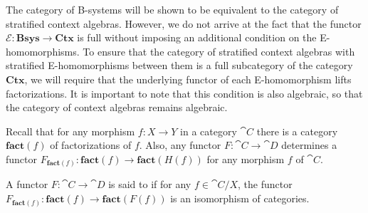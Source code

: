 The category of B-systems will be shown to be equivalent to the category of
stratified context algebras. However, we do not arrive at the fact that the functor
$\mathcal{E}:\mathbf{Bsys}\to\mathbf{Ctx}$ is full without imposing an additional
condition on the E-homomorphisms. 
To ensure that the category of stratified context algebras with stratified 
E-homomorphisms between them is a full subcategory of the category 
$\mathbf{Ctx}$, we will require that the underlying functor of each E-homomorphism
lifts factorizations. It is
important to note that this condition is also algebraic, so that the category
of context algebras remains algebraic.

Recall that for any morphism $f:X\to Y$ in a category $\cat{C}$ there is a category
$\mathbf{fact}(f)$ of factorizations of $f$. Also, any functor $F:\cat{C}\to\cat{D}$
determines a functor $F_{\mathbf{fact}(f)}:\mathbf{fact}(f)\to\mathbf{fact}(H(f))$
for any morphism $f$ of $\cat{C}$.

\begin{defn}
A functor $F:\cat{C}\to\cat{D}$ is said to
 if for any $f\in\cat{C}/X$, the functor
$F_{\mathbf{fact}(f)}:\mathbf{fact}(f)\to\mathbf{fact}(F(f))$ is an isomorphism
of categories. 
\end{defn}

\begin{comment}
\begin{rmk}
We may choose the property of lifting factorizations
to involve either an equivalence or an isomorphism of categories. The
isomorphism-version, would say that for every factorization $h'\circ g'$
of $F(f)$ there is a unique factorization $f\jdeq h\circ g$ in $\cat{C}$ such
that $F(g)\jdeq g'$ and $F(h)\jdeq h'$. In the version with equivalences,
the uniqueness is replaced by uniqueness up to isomorphism, and the equalites
are replaced by an isomorphism in $\mathbf{fact}(F(f))$. 

It is easier to state the isomorphism version of lifting factorizations with
inference rules and it might be easier to explain this condition on type theoretical
grounds, although the equivalence version has the advantage of being
categorical (i.e.~invariant under equivalence of categories).

In the present
context, it doesn't matter very much which one we pick: the categories in which
we're interested are all posets.
\end{rmk}
\end{comment}

